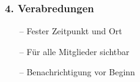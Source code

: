 \documentclass[aspectratio=1610]{beamer}
\begin{document}
	
	\begin{frame}[plain]
	\frametitle{4. Verabredungen}
		\begin{minipage}{0.5\textwidth}
			\setlength{\fboxsep}{0pt}%
			\setlength{\fboxrule}{1pt}%
			\captionsetup{labelformat=empty}
			\centering
		\end{minipage}%
		\begin{minipage}{0.5\textwidth}
			\begin{itemize}
				\setlength\itemsep{0.3em}
				\item[--] Fester Zeitpunkt und Ort
				\item[--] Für alle Mitglieder sichtbar
				\item[--] Benachrichtigung vor Beginn
			\end{itemize}
		\end{minipage}
	\end{frame}
\end{document}
